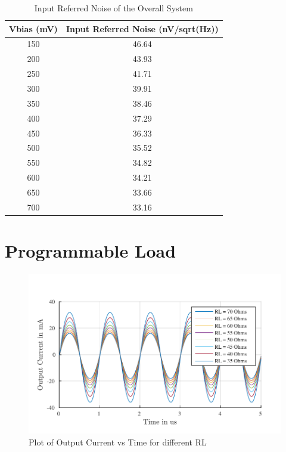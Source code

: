 \begin{table} [H]
\centering
\begin{tabular}{@{}cc@{}}
\toprule
Vbias (mV)			& Input Referred Noise (nV/sqrt(Hz))	\\ \midrule
150					& 46.64 \\
200					& 43.93 \\
250					& 41.71 \\
300					& 39.91 \\
350					& 38.46 \\
400					& 37.29 \\
450					& 36.33 \\
500					& 35.52 \\
550					& 34.82 \\
600					& 34.21 \\
650					& 33.66 \\
700 				& 33.16 \\
\bottomrule
\end{tabular}
\caption{Input Referred Noise of the Overall System}
\end{table}


\section{Programmable Load}

\begin{figure} [H]
\centering
\includegraphics[scale=1]{Figures/Plots/Ov_Sine_RL.pdf}
\caption{Plot of Output Current vs Time for different RL}
\end{figure}

